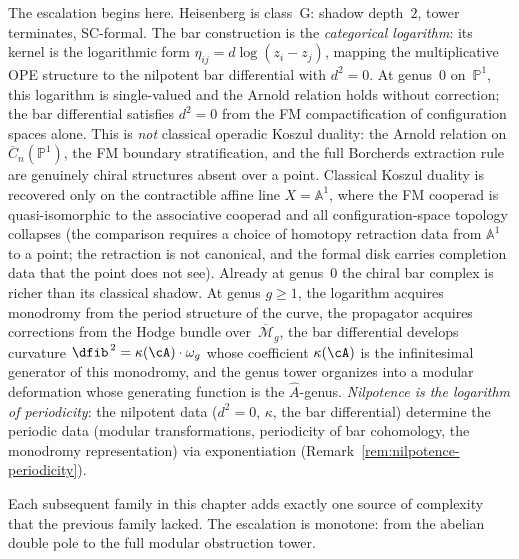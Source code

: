 The escalation begins here. Heisenberg is class~G:
shadow depth~$2$, tower terminates, SC-formal. The bar construction
is the \emph{categorical logarithm}: its kernel is the logarithmic
form $\eta_{ij} = d\log(z_i - z_j)$, mapping the multiplicative
OPE structure to the nilpotent bar differential with $d^2 = 0$.
At genus~$0$ on~$\mathbb{P}^1$, this logarithm is single-valued
and the Arnold relation holds without correction; the bar differential
satisfies $d^2 = 0$ from the FM compactification of configuration spaces
alone. This is \emph{not} classical operadic Koszul duality: the
Arnold relation on $\overline{C}_n(\mathbb{P}^1)$, the FM boundary
stratification, and the full Borcherds extraction rule are genuinely
chiral structures absent over a point. Classical Koszul duality
is recovered only on the contractible affine line
$X = \mathbb{A}^1$, where the FM cooperad is quasi-isomorphic
to the associative cooperad and all configuration-space topology
collapses (the comparison requires a choice of homotopy retraction
data from $\mathbb{A}^1$ to a point; the retraction is not
canonical, and the formal disk carries completion data that the
point does not see). Already at genus~$0$ the chiral bar complex
is richer than its classical shadow. At genus $g \geq 1$, the
logarithm acquires monodromy from the period structure of the curve,
the propagator acquires corrections from the Hodge bundle
over~$\overline{\mathcal{M}}_g$, the bar differential develops
curvature $\dfib^{\,2} = \kappa(\cA)\cdot\omega_g$ whose coefficient
$\kappa(\cA)$ is the infinitesimal generator of this monodromy, and
the genus tower organizes into a modular deformation whose generating
function is the $\hat{A}$-genus. \emph{Nilpotence is the logarithm
of periodicity}: the nilpotent data ($d^2 = 0$, $\kappa$, the bar
differential) determine the periodic data (modular transformations,
periodicity of bar cohomology, the monodromy representation) via
exponentiation (Remark~\ref{rem:nilpotence-periodicity}).

Each subsequent family in this chapter adds exactly one source of
complexity that the previous family lacked. The escalation is
monotone: from the abelian double pole to the full modular
obstruction tower.

